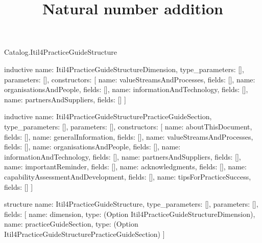 \begin{lexlean}{Catalog.Itil4PracticeGuideStructure}
\title{Natural number addition}
\begin{semanticmodule}
inductive{
  name: Itil4PracticeGuideStructureDimension,
  type_parameters: [],
  parameters: [],
  constructors: [
    {name: valueStreamsAndProcesses, fields: []},
    {name: organisationsAndPeople, fields: []},
    {name: informationAndTechnology, fields: []},
    {name: partnersAndSuppliers, fields: []}
  ]
}

inductive{
  name: Itil4PracticeGuideStructurePracticeGuideSection,
  type_parameters: [],
  parameters: [],
  constructors: [
    {name: aboutThisDocument, fields: []},
    {name: generalInformation, fields: []},
    {name: valueStreamsAndProcesses, fields: []},
    {name: organisationsAndPeople, fields: []},
    {name: informationAndTechnology, fields: []},
    {name: partnersAndSuppliers, fields: []},
    {name: importantReminder, fields: []},
    {name: acknowledgments, fields: []},
    {name: capabilityAssessmentAndDevelopment, fields: []},
    {name: tipsForPracticeSuccess, fields: []}
  ]
}

structure{
  name: Itil4PracticeGuideStructure,
  type_parameters: [],
  parameters: [],
  fields: [
    {name: dimension, type: (Option Itil4PracticeGuideStructureDimension)},
    {name: practiceGuideSection, type: (Option Itil4PracticeGuideStructurePracticeGuideSection)}
  ]
}
\end{semanticmodule}
\end{lexlean}
